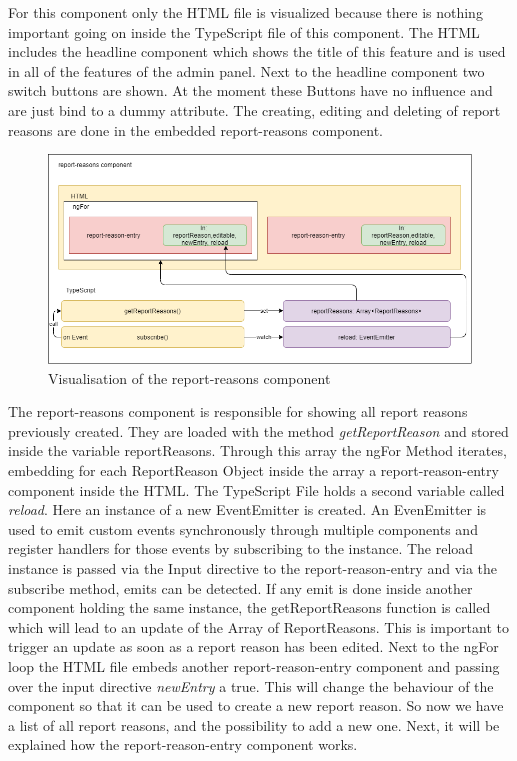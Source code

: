 For this component only the HTML file is visualized because there is nothing important going on inside the TypeScript
file of this component.
The HTML includes the headline component which shows the title of this feature and is used in all of the features of
the admin panel.
Next to the headline component two switch buttons are shown.
At the moment these Buttons have no influence and are just bind to a dummy attribute.
The creating, editing and deleting of report reasons are done in the embedded report-reasons component.

\begin{figure}[h]
    \centering
    \includegraphics[width=1.0\textwidth]{./images/report_reasons_2}
    \caption{Visualisation of the report-reasons component}
    \label{fig:reportreason}
\end{figure}
\vspace{5mm}

The report-reasons component is responsible for showing all report reasons previously created.
They are loaded with the method \textit{getReportReason} and stored inside the variable reportReasons.
Through this array the ngFor Method iterates, embedding for each ReportReason Object inside the array a
report-reason-entry component inside the HTML.
The TypeScript File holds a second variable called \textit{reload}.
Here an instance of a new EventEmitter is created.
An EvenEmitter is used to emit custom events synchronously through multiple components and register handlers for
those events by subscribing to the instance.
The reload instance is passed via the Input directive to the report-reason-entry and via the subscribe method,
emits can be detected.
If any emit is done inside another component holding the same instance, the getReportReasons function is called which
will lead to an update of the Array of ReportReasons.
This is important to trigger an update as soon as a report reason has been edited.
Next to the ngFor loop the HTML file embeds another report-reason-entry component and passing over the input
directive \textit{newEntry} a true.
This will change the behaviour of the component so that it can be used to create a new report reason.
So now we have a list of all report reasons, and the possibility to add a new one.
Next, it will be explained how the report-reason-entry component works.

